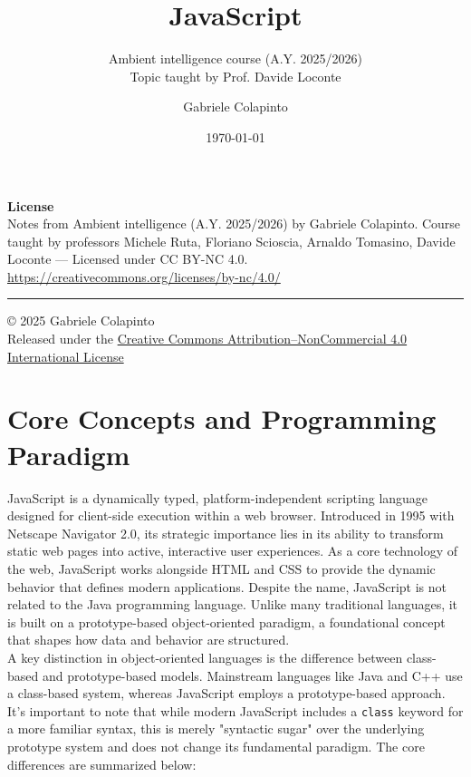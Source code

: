 \documentclass{scrbook}
\title{JavaScript}
\subtitle{Ambient intelligence course (A.Y. 2025/2026)\\Topic taught by Prof. Davide Loconte}
\author{Gabriele Colapinto}
\date{\today}
\begin{document}
\maketitle
\thispagestyle{empty}

{\Large\textbf{License}} \\
{Notes from Ambient intelligence (A.Y. 2025/2026) by Gabriele Colapinto. 
Course taught by professors Michele Ruta, Floriano Scioscia, Arnaldo Tomasino, Davide Loconte — 
Licensed under CC BY-NC 4.0.\\
\url{https://creativecommons.org/licenses/by-nc/4.0/}}

\vspace*{\fill}
\rule{\textwidth}{0.2pt}
\small{© 2025 Gabriele Colapinto \\
Released under the \href{https://creativecommons.org/licenses/by-nc/4.0/}{Creative Commons Attribution–NonCommercial 4.0 International License}}

\clearpage

\tableofcontents

\chapter{Core Concepts and Programming Paradigm}

JavaScript is a dynamically typed, platform-independent scripting language designed for client-side execution within a web browser. Introduced in 1995 with Netscape Navigator 2.0, its strategic importance lies in its ability to transform static web pages into active, interactive user experiences. As a core technology of the web, JavaScript works alongside HTML and CSS to provide the dynamic behavior that defines modern applications. Despite the name, JavaScript is not related to the Java programming language. Unlike many traditional languages, it is built on a prototype-based object-oriented paradigm, a foundational concept that shapes how data and behavior are structured. \\

A key distinction in object-oriented languages is the difference between class-based and prototype-based models. Mainstream languages like Java and C++ use a class-based system, whereas JavaScript employs a prototype-based approach. It's important to note that while modern JavaScript includes a \texttt{class} keyword for a more familiar syntax, this is merely "syntactic sugar" over the underlying prototype system and does not change its fundamental paradigm. The core differences are summarized below:
\end{document}
